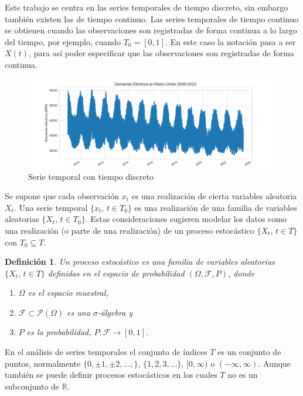 \documentclass[12pt,twoside]{article}
\newtheorem{definition}[theorem]{Definición}
\begin{document}
Este trabajo se centra en las series temporales de tiempo discreto, sin embargo también existen las de tiempo continuo. Las series temporales de tiempo continuo se obtienen cuando las observaciones son registradas de forma continua a lo largo del tiempo, por ejemplo, cuando $T_0 = [0,1]$. En este caso la notación pasa a ser $X(t)$, para así poder especificar que las observaciones son registradas de forma continua.


\begin{figure}[h]
\centering
    \includegraphics[width = \textwidth]{imagenes/TimeSeries.png}
    \caption{Serie temporal con tiempo discreto }\label{fig:TimeSeries}
\end{figure}





Se supone que cada observación $x_t$ es una realización de cierta variables aleatoria $X_t$. Una serie temporal $\{x_t, \, t \in T_0\}$ es una realización de una familia de variables aleatorias $\{X_t, \, t \in T_0\}$. Estas consideraciones sugieren modelar los datos como una realización (o parte de una realización) de un proceso estocástico $\{X_t, \, t \in T\}$ con $T_0 \subseteq T$.

\begin{definition}
    Un proceso estocástico es una familia de variables aleatorias $\{X_t, \, t \in T\}$ definidas en el espacio de probabilidad $(\Omega, \mathcal{F}, P)$, donde
    \begin{enumerate}
        \item $\Omega$ es el espacio muestral,
        \item $\mathcal{F} \subset \mathcal{P}(\Omega)$ es una $\sigma$-álgebra y 
        \item $P$ es la probabilidad, $P:\mathcal{F} \longrightarrow [0,1]$.
    \end{enumerate}
\end{definition}

En el análisis de series temporales el conjunto de índices $T$ es un conjunto de puntos, normalmente $\{0, \pm1, \pm2, \dotsc, \}$, $\{1,2,3,\dotsc\}$, $[0, \infty)$ o $(-\infty, \infty)$. Aunque también se puede definir procesos estocásticos en los cuales $T$ no es un subconjunto de $\mathbb{R}$.
\end{document}
